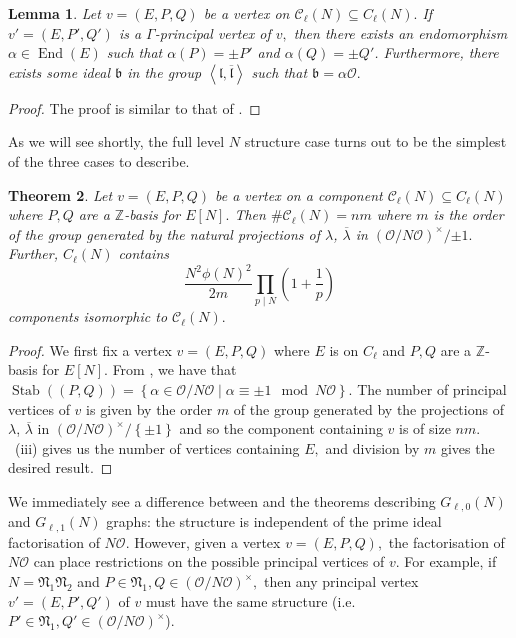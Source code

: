\documentclass[11pt,a4paper]{amsart}
\theoremstyle{plain}
\newtheorem{thm}{Theorem}[section]
\newtheorem{lem}[thm]{Lemma}
\theoremstyle{definition}
\theoremstyle{remark}
\DeclareMathOperator{\Stab}{Stab}
\DeclareMathOperator{\Endo}{End}
\begin{document}
\begin{lem}\label{lem:principal-vertex-full}
Let $v = (E,P,Q)$ be a vertex on $\mathcal{C}_{\ell}(N) \subseteq C_{\ell}(N).$ If $v' = (E, P',Q')$ is a $\Gamma$-principal vertex of $v,$ then there exists an endomorphism $\alpha \in \Endo(E)$ such that $\alpha(P) = \pm P'$ and $\alpha(Q) = \pm Q'$. Furthermore, there exists some ideal $\mathfrak{b}$ in the group $\left\langle \mathfrak{l}, \overline{\mathfrak{l}} \right\rangle$ such that $\mathfrak{b} = \alpha\mathcal{O}.$
\end{lem}
\begin{proof}
  The proof is similar to that of .
\end{proof}

As we will see shortly, the full level $N$ structure case turns out to be the simplest of the three cases to describe.

\begin{thm}\label{thm:crater-structure-full}
  Let $v = (E, P, Q)$ be a vertex on a component $\mathcal{C}_{\ell}(N) \subseteq C_{\ell}(N)$ where $P, Q$ are a $\mathbb{Z}$-basis for $E[N].$ Then $\# \mathcal{C}_{\ell}(N) = n m $ where $m$ is the order of the group generated by the natural projections of $\lambda$, $\overline{\lambda}$ in $(\mathcal{O}/N \mathcal{O})^{\times}/{\pm 1}.$ Further, $C_{\ell}(N)$ contains
  \[
    \frac{N^2\phi(N)^2}{2m}\prod_{p \mid N}\left( 1 + \frac{1}{p} \right)
  \]
  components isomorphic to $\mathcal{C}_{\ell}(N).$
\end{thm}
\begin{proof}
  We first fix a vertex $v = (E, P, Q)$ where $E$ is on $C_{\ell}$ and $P, Q$ are a $\mathbb{Z}$-basis for $E[N].$ From , we have that $\Stab((P,Q)) = \left\{ \alpha \in \mathcal{O}/N \mathcal{O} \mid \alpha \equiv \pm 1 \mod N \mathcal{O} \right\}.$ The number of principal vertices of $v$ is given by the order $m$ of the group generated by the projections of $\lambda$, $\overline{\lambda}$ in $(\mathcal{O}/N\mathcal{O})^{\times}/\left\{ \pm 1 \right\}$ and so the component containing $v$ is of size $nm.$ ~(iii) gives us the number of vertices containing $E,$ and division by $m$ gives the desired result.
\end{proof}
We immediately see a difference between  and the theorems describing $G_{\ell,0}(N)$ and $G_{\ell,1}(N)$ graphs: the structure is independent of the prime ideal factorisation of $N \mathcal{O}.$ However, given a vertex $v = (E, P, Q),$ the factorisation of $N \mathcal{O}$ can place restrictions on the possible principal vertices of $v.$ For example, if $N = \mathfrak{N}_1 \mathfrak{N}_2$ and $P \in \mathfrak{N}_1, Q \in (\mathcal{O}/N\mathcal{O})^{\times},$ then any principal vertex $v' = (E, P', Q')$ of $v$ must have the same structure (i.e. $P' \in \mathfrak{N}_1, Q' \in (\mathcal{O}/N\mathcal{O})^{\times}$).
\end{document}
